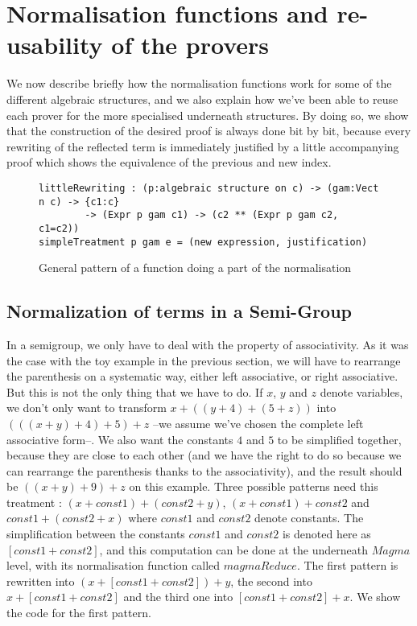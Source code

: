 \section {Normalisation functions and re-usability of the provers}

We now describe briefly how the normalisation functions work for some of the different algebraic structures, and we also explain how we've been able to reuse each prover for the more specialised underneath structures. By doing so, we show that the construction of the desired proof is always done bit by bit, because every rewriting of the reflected term is immediately justified by a little accompanying proof which shows the equivalence of the previous and new index.
\begin{figure}[H]
\figrule
\begin{center}
\begin{verbatim}
littleRewriting : (p:algebraic structure on c) -> (gam:Vect n c) -> {c1:c} 
        -> (Expr p gam c1) -> (c2 ** (Expr p gam c2, c1=c2))
simpleTreatment p gam e = (new expression, justification)
\end{verbatim}
\end{center}
\caption{General pattern of a function doing a part of the normalisation}
\figrule
\end{figure}

	\subsection {Normalization of terms in a Semi-Group}
In a semigroup, we only have to deal with the property of associativity. As it was the case with the toy example in the previous section, we will have to rearrange the parenthesis on a systematic way, either left associative, or right associative. But this is not the only thing that we have to do. If $x$, $y$ and $z$ denote variables, we don't only want to transform $x+((y+4)+(5+z))$ into $(((x+y)+4)+5)+z$ --we assume we've chosen the complete left associative form--. We also want the constants $4$ and $5$ to be simplified together, because they are close to each other (and we have the right to do so because we can rearrange the parenthesis thanks to the associativity), and the result should be $((x+y)+9)+z$ on this example. Three possible patterns need this treatment : $(x+const1)+(const2+y)$, $(x + const1) + const2$  and $const1 + (const2 + x)$ where $const1$ and $const2$ denote constants. The simplification between the constants $const1$ and $const2$ is denoted here as $[const1+const2]$, and this computation can be done at the underneath $Magma$ level, with its normalisation function called $magmaReduce$.
The first pattern is rewritten into $(x + [const1+const2]) + y$, the second into $x + [const1+const2]$ and the third one into $[const1 + const2] + x$.
We show the code for the first pattern.

